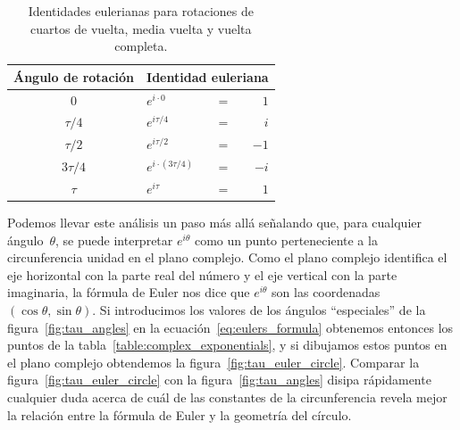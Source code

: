 \begin{table}
\begin{center}
\begin{tabular}{cllr}
Ángulo de rotación & \multicolumn{3}{c}{Identidad euleriana} \\ \hline
$0$ & $e^{i\cdot0}$ & $ = $ & $1$ \smallskip \\
$\tau/4$ & $e^{i\tau/4}$ & $ = $ & $i$ \smallskip \\
$\tau/2$ & $e^{i\tau/2}$ & $ = $ & $-1$ \smallskip \\
$3\tau/4$ & $e^{i\cdot(3\tau/4)}$ & $ = $ & $-i$ \smallskip \\
$\tau$ & $e^{i\tau}$ & $ = $ & $1$
\end{tabular}
\end{center}
\caption{Identidades eulerianas para rotaciones de cuartos de vuelta, media vuelta y vuelta completa.\label{table:eulerian_identities}}
\end{table}

Podemos llevar este análisis un paso más allá señalando que, para cualquier ángulo~$\theta$, se puede interpretar $e^{i\theta}$ como un punto perteneciente a la circunferencia unidad en el plano complejo. Como el plano complejo identifica el eje horizontal con la parte real del número y el eje vertical con la parte imaginaria, la fórmula de Euler nos dice que $e^{i\theta}$ son las coordenadas $(\cos\theta, \sin\theta)$. Si introducimos los valores de los ángulos ``especiales'' de la figura~\ref{fig:tau_angles} en la ecuación~\eqref{eq:eulers_formula} obtenemos entonces los puntos de la tabla~\ref{table:complex_exponentials}, y si dibujamos estos puntos en el plano complejo obtendemos la figura~\ref{fig:tau_euler_circle}. Comparar la figura~\ref{fig:tau_euler_circle} con la figura~\ref{fig:tau_angles} disipa rápidamente cualquier duda acerca de cuál de las constantes de la circunferencia revela mejor la relación entre la fórmula de Euler y la geometría del círculo.


